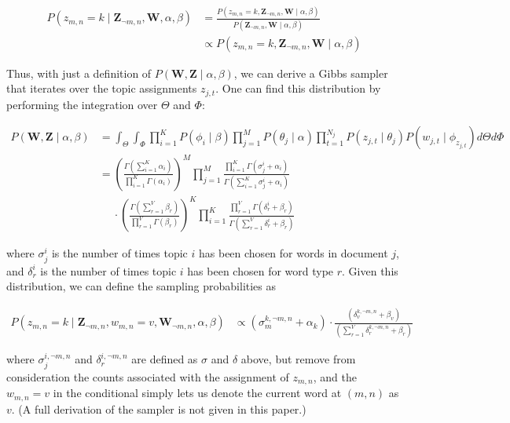\documentclass[11pt]{article}
\begin{document}
\begin{align}
  P(z_{m,n} = k \mid \mathbf{Z}_{\neg m,n}, \mathbf{W}, \alpha, \beta)
  &=
  \frac{P(z_{m,n} = k, \mathbf{Z}_{\neg m,n}, \mathbf{W} \mid \alpha, \beta)}
  {P(\mathbf{Z}_{\neg m,n}, \mathbf{W} \mid \alpha, \beta)}\nonumber\\
  & \propto P(z_{m,n} = k, \mathbf{Z}_{\neg m,n}, \mathbf{W} \mid \alpha,
    \beta)
\end{align}

Thus, with just a definition of $P(\mathbf{W}, \mathbf{Z} \mid \alpha,
\beta)$, we can derive a Gibbs sampler that iterates over the topic
assignments $z_{j,t}$. One can find this distribution by performing the
integration over $\Theta$ and $\Phi$:

\begin{align}
  P(\mathbf{W}, \mathbf{Z} \mid \alpha, \beta)
  &= \int_\Theta
     \int_\Phi
     \prod_{i=1}^K P(\phi_i \mid \beta)
     \prod_{j=1}^M P(\theta_j \mid \alpha)
     \prod_{t=1}^{N_j} P(z_{j,t} \mid \theta_j)
     P(w_{j,t} \mid \phi_{z_{j,t}}) d\Theta d\Phi\nonumber\\
  &= \left(
       \frac{\Gamma(\sum_{i=1}^K \alpha_i)}
       {\prod_{i=1}^K \Gamma(\alpha_i)}
     \right)^M
     \prod_{j=1}^M
     \frac{\prod_{i=1}^K \Gamma(\sigma_j^i + \alpha_i)}
     {\Gamma(\sum_{i=1}^K\sigma_j^i + \alpha_i)}\nonumber\\
     &\quad\;\cdot
     \left(
       \frac{\Gamma(\sum_{r=1}^V \beta_r)}
       {\prod_{r=1}^V \Gamma(\beta_r)}
     \right)^K
     \prod_{i=1}^K
     \frac{\prod_{r=1}^V \Gamma(\delta_r^i + \beta_r)}
     {\Gamma(\sum_{r=1}^V \delta_r^i + \beta_r)}
\end{align}

where $\sigma_j^i$ is the number of times topic $i$ has been chosen for
words in document $j$, and $\delta_r^i$ is the number of times topic $i$
has been chosen for word type $r$. Given this distribution, we can define
the sampling probabilities as

\begin{align}
  P(z_{m,n} = k \mid \mathbf{Z}_{\neg m,n}, w_{m,n} = v, \mathbf{W}_{\neg
  m,n}, \alpha, \beta)
  &\propto
  (\sigma_m^{k, \neg m,n} + \alpha_k)
  \cdot
  \frac{\left(\delta_v^{k,\neg m,n} + \beta_v\right)}
  {\left(\sum_{r=1}^V \delta_r^{k,\neg m,n} + \beta_r\right)}
  \label{eqn:cgs}
\end{align}

where $\sigma_j^{i,\neg m,n}$ and $\delta_r^{i,\neg m,n}$ are defined as
$\sigma$ and $\delta$ above, but remove from consideration the counts
associated with the assignment of $z_{m,n}$, and the $w_{m,n} = v$ in the
conditional simply lets us denote the current word at $(m,n)$ as $v$. (A
full derivation of the sampler is not given in this paper.)
\end{document}
